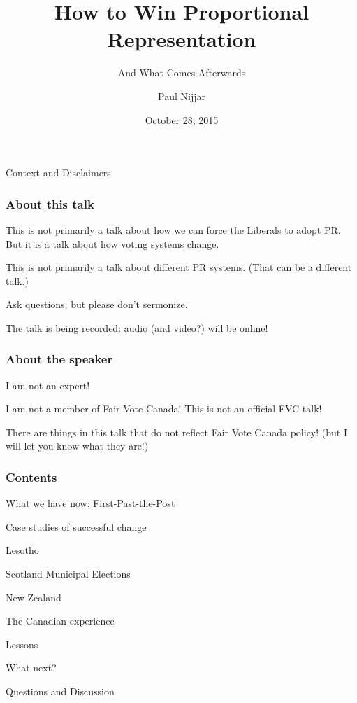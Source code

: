 \documentclass[14pt,t,hyperref={colorlinks=true,urlcolor=red}]{beamer}
\title{How to Win Proportional Representation}
\subtitle{And What Comes Afterwards}
\author{Paul Nijjar}
\date{October 28, 2015}
\newcommand{\spooky}[1]{{\Huge \fontfamily{lgfz}\fontseries{m}\fontshape{n} \selectfont #1}}
\newcommand{\bigspookytext}[1]
{
\vspace{\stretch{1}}
\begin{center}
\spooky{#1}
\end{center}
\vspace{\stretch{1}}
}
\begin{document}
\frame[plain]{\maketitle}



\begin{frame}

\bigspookytext{Context and Disclaimers}

\end{frame}


\begin{frame}
\frametitle{About this talk}

This is not primarily a talk about how we can force the Liberals to
adopt PR. But it is a talk about how voting systems change.

This is not primarily a talk about different PR
systems. (That can be a different talk.)

Ask questions, but please don't sermonize.

The talk is being recorded: audio (and video?) will be online!

\end{frame}



\begin{frame}
\frametitle{About the speaker}

I am not an expert!

I am not a member of Fair Vote Canada! This is not an official FVC
talk!

There are things in this talk that do not reflect Fair Vote Canada
policy! (but I will let you know what they are!)

\end{frame}


\begin{frame}
\frametitle{Contents}

\begin{itemize*}

\item What we have now: First-Past-the-Post

\item Case studies of successful change
\begin{itemize*}
  \item Lesotho
  \item Scotland Municipal Elections
  \item New Zealand
\end{itemize*}

\item The Canadian experience

\item Lessons

\item What next?

\item Questions and Discussion

\end{itemize*}

\end{frame}
\end{document}
